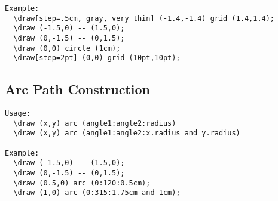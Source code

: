 \documentclass[a4paper,12pt]{article}
\begin{document}
\begin{verbatim}
Example:
  \draw[step=.5cm, gray, very thin] (-1.4,-1.4) grid (1.4,1.4);
  \draw (-1.5,0) -- (1.5,0);
  \draw (0,-1.5) -- (0,1.5);
  \draw (0,0) circle (1cm);
  \draw[step=2pt] (0,0) grid (10pt,10pt);
\end{verbatim}


\subsection{Arc Path Construction}
\begin{verbatim}
Usage:
  \draw (x,y) arc (angle1:angle2:radius)
  \draw (x,y) arc (angle1:angle2:x.radius and y.radius)

Example:
  \draw (-1.5,0) -- (1.5,0);
  \draw (0,-1.5) -- (0,1.5);
  \draw (0.5,0) arc (0:120:0.5cm);
  \draw (1,0) arc (0:315:1.75cm and 1cm);
\end{verbatim}

\end{document}
